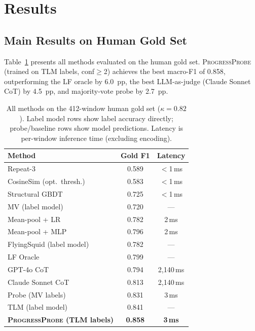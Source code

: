 \documentclass[11pt,a4paper]{article}
\newcommand{\ours}{\textsc{ProgressProbe}}
\newcommand{\tlm}{\textsc{TLM}}
\begin{document}
\section{Results}
\label{sec:results}

\subsection{Main Results on Human Gold Set}
\label{sec:main-results}

Table~\ref{tab:main} presents all methods evaluated on the human gold set. \ours{} (trained on \tlm{} labels, conf$\geq$2) achieves the best macro-F1 of 0.858, outperforming the LF oracle by 6.0~pp, the best LLM-as-judge (Claude Sonnet CoT) by 4.5~pp, and majority-vote probe by 2.7~pp.

\begin{table}[t]
\centering
\small
\begin{tabular}{lcc}
\toprule
\textbf{Method} & \textbf{Gold F1} & \textbf{Latency} \\
\midrule
Repeat-3 & 0.589 & $<$1\,ms \\
CosineSim (opt.\ thresh.) & 0.583 & $<$1\,ms \\
Structural GBDT & 0.725 & $<$1\,ms \\
MV (label model) & 0.720 & --- \\
Mean-pool + LR & 0.782 & 2\,ms \\
Mean-pool + MLP & 0.796 & 2\,ms \\
FlyingSquid (label model) & 0.782 & --- \\
LF Oracle & 0.799 & --- \\
GPT-4o CoT & 0.794 & 2{,}140\,ms \\
Claude Sonnet CoT & 0.813 & 2{,}140\,ms \\
Probe (MV labels) & 0.831 & 3\,ms \\
\tlm{} (label model) & 0.841 & --- \\
\textbf{\ours{} (\tlm{} labels)} & \textbf{0.858} & \textbf{3\,ms} \\
\bottomrule
\end{tabular}
\caption{All methods on the 412-window human gold set ($\kappa{=}0.82$). Label model rows show label accuracy directly; probe/baseline rows show model predictions. Latency is per-window inference time (excluding encoding).}
\label{tab:main}
\end{table}
\end{document}
